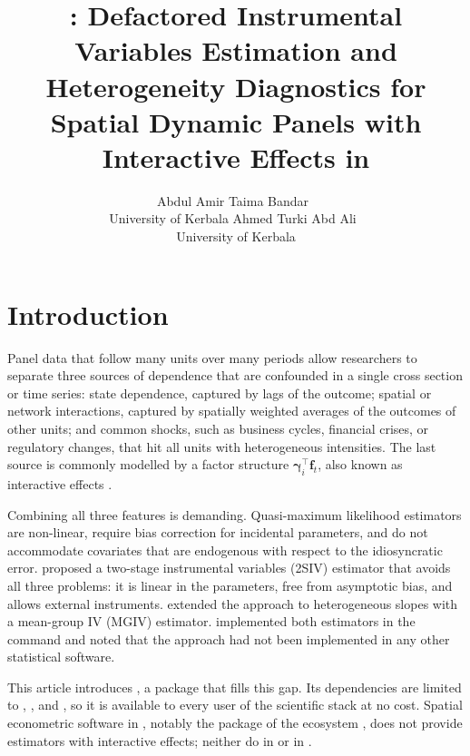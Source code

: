 \documentclass[article]{jss}
\author{Abdul Amir Taima Bandar~\orcidlink{0009-0007-1118-1993}\\University of Kerbala
   \And Ahmed Turki Abd Ali~\orcidlink{0009-0007-5402-8948}\\University of Kerbala}
\title{\pkg{spdfiv}: Defactored Instrumental Variables Estimation and Heterogeneity Diagnostics for Spatial Dynamic Panels with Interactive Effects in \proglang{Python}}
\begin{document}
\section{Introduction} \label{sec:intro}

Panel data that follow many units over many periods allow researchers to
separate three sources of dependence that are confounded in a single cross
section or time series: state dependence, captured by lags of the outcome;
spatial or network interactions, captured by spatially weighted averages of
the outcomes of other units; and common shocks, such as business cycles,
financial crises, or regulatory changes, that hit all units with
heterogeneous intensities. The last source is commonly modelled by a factor
structure $\bm\gamma_i^\top\bm f_t$, also known as interactive effects
\citep{Pesaran:2006,Bai:2003}.

Combining all three features is demanding. Quasi-maximum likelihood
estimators \citep{Yu+DeJong+Lee:2008,Shi+Lee:2017,Bai+Li:2021} are
non-linear, require bias correction for incidental parameters, and do not
accommodate covariates that are endogenous with respect to the idiosyncratic
error. \citet{Cui+Sarafidis+Yamagata:2023} proposed a two-stage
instrumental variables (2SIV) estimator that avoids all three problems: it
is linear in the parameters, free from asymptotic bias, and allows external
instruments. \citet{Chen+Cui+Sarafidis:2025} extended the approach to
heterogeneous slopes with a mean-group IV (MGIV) estimator.
\citet{Kripfganz+Sarafidis:2025} implemented both estimators in the
 command  and noted that the approach had
not been implemented in any other statistical software.

This article introduces , a  \citep{Python} package
that fills this gap. Its dependencies are limited to 
\citep{Harris+Millman+vanderWalt:2020}, 
\citep{Virtanen+Gommers+Oliphant:2020}, and 
\citep{McKinney:2010}, so it is available to every user of the scientific
 stack at no cost. Spatial econometric software in
, notably the  package of the 
ecosystem \citep{Rey+Anselin:2010,Rey+Anselin+Amaral:2022}, does not
provide estimators with interactive effects; neither do 
\citep{Millo+Piras:2012} in  or 
\citep{Belotti+Hughes+Mortari:2017} in .
\end{document}
